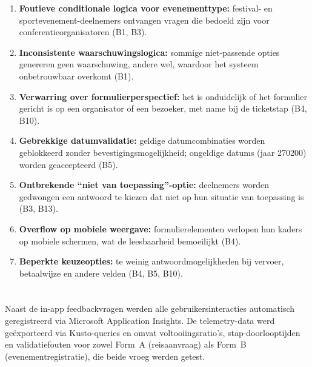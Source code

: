 \begin{enumerate}
  \item \textbf{Foutieve conditionale logica voor evenementtype:} festival- en sportevenement-deelnemers ontvangen vragen die bedoeld zijn voor conferentieorganisatoren (B1, B3).
  \item \textbf{Inconsistente waarschuwingslogica:} sommige niet-passende opties genereren geen waarschuwing, andere wel, waardoor het systeem onbetrouwbaar overkomt (B1).
  \item \textbf{Verwarring over formulierperspectief:} het is onduidelijk of het formulier gericht is op een organisator of een bezoeker, met name bij de ticketstap (B4, B10).
  \item \textbf{Gebrekkige datumvalidatie:} geldige datumcombinaties worden geblokkeerd zonder bevestigingsmogelijkheid; ongeldige datums (jaar 270200) worden geaccepteerd (B5).
  \item \textbf{Ontbrekende ``niet van toepassing''-optie:} deelnemers worden gedwongen een antwoord te kiezen dat niet op hun situatie van toepassing is (B3, B13).
  \item \textbf{Overflow op mobiele weergave:} formulierelementen verlopen hun kaders op mobiele schermen, wat de leesbaarheid bemoeilijkt (B4).
  \item \textbf{Beperkte keuzeopties:} te weinig antwoordmogelijkheden bij vervoer, betaalwijze en andere velden (B4, B5, B10).
\end{enumerate}

\section{}

Naast de in-app feedbackvragen werden alle gebruikersinteracties automatisch geregistreerd via Microsoft Application Insights. De telemetry-data werd geëxporteerd via Kusto-queries en omvat voltooiingsratio's, stap-doorlooptijden en validatiefouten voor zowel Form~A (reisaanvraag) als Form~B (evenementregistratie), die beide vroeg werden getest.

\subsection{}

